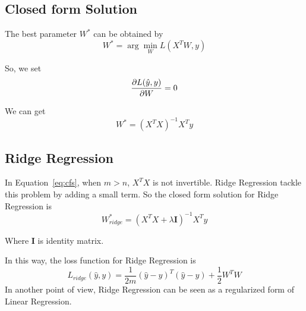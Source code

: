 \documentclass[journal, a4paper]{IEEEtran}
\begin{document}
\subsection{Closed form Solution}
The best parameter $W^{*}$ can be obtained by \\
\begin{equation}
 W^{*} = \arg\min_{W}L(X^{T}W, y)  
\end{equation} \par
So, we set 
\begin{equation}
\frac{\partial L(\hat{y}, y)}{\partial W} = 0 \\
\end{equation} \par
We can get 
\begin{equation}
\label{eq:cfs}
W^{*} = (X^{T}X)^{-1}X^{T}y
\end{equation}
\subsection{Ridge Regression}
In Equation~\ref{eq:cfs}, when $m > n$, $X^{T}X$ is not invertible. Ridge Regression tackle this problem by adding a small term. So the closed form solution for Ridge Regression is
\begin{equation}
W_{ridge}^{*} = (X^{T}X + \lambda \mathbf{I})^{-1}X^{T}y
\end{equation} \par
Where $\mathbf{I}$ is identity matrix. \par
In this way, the loss function for Ridge Regression is
\begin{equation}
L_{ridge}(\hat{y}, y) = \frac{1}{2m}(\hat{y} - y)^{T}(\hat{y} - y)  + \frac{1}{2} W^{T} W
\end{equation}
In another point of view, Ridge Regression can be seen as a regularized form of Linear Regression.
\end{document}

